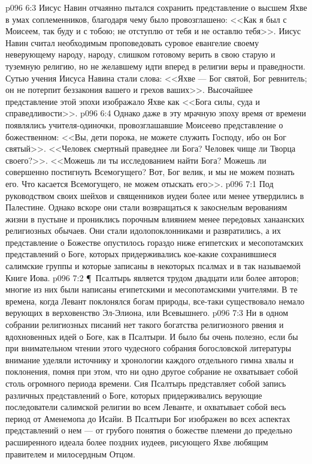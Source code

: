 \vs p096 6:3 Иисус Навин отчаянно пытался сохранить представление о высшем Яхве в умах соплеменников, благодаря чему было провозглашено: <<Как я был с Моисеем, так буду и с тобою; не отступлю от тебя и не оставлю тебя>>. Иисус Навин считал необходимым проповедовать суровое евангелие своему неверующему народу, народу, слишком готовому верить в свою старую и туземную религию, но не желавшему идти вперед в религии веры и праведности. Сутью учения Иисуса Навина стали слова: <<Яхве --- Бог святой, Бог ревнитель; он не потерпит беззакония вашего и грехов ваших>>. Высочайшее представление этой эпохи изображало Яхве как <<Бога силы, суда и справедливости>>.
\vs p096 6:4 Однако даже в эту мрачную эпоху время от времени появлялись учителя\hyp{}одиночки, провозглашавшие Моисеево представление о божественном: <<Вы, дети порока, не можете служить Господу, ибо он Бог святый>>. <<Человек смертный праведнее ли Бога? Человек чище ли Творца своего?>>. <<Можешь ли ты исследованием найти Бога? Можешь ли совершенно постигнуть Всемогущего? Вот, Бог велик, и мы не можем познать его. Что касается Всемогущего, не можем отыскать его>>.
\vs p096 7:1 Под руководством своих шейхов и священников иудеи более или менее утвердились в Палестине. Однако вскоре они стали возвращаться к закоснелым верованиям жизни в пустыне и прониклись порочным влиянием менее передовых ханаанских религиозных обычаев. Они стали идолопоклонниками и развратились, а их представление о Божестве опустилось гораздо ниже египетских и месопотамских представлений о Боге, которых придерживались кое\hyp{}какие сохранившиеся салимские группы и которые записаны в некоторых псалмах и в так называемой Книге Иова.
\vs p096 7:2 \P\ Псалтырь является трудом двадцати или более авторов; многие из них были написаны египетскими и месопотамскими учителями. В те времена, когда Левант поклонялся богам природы, все\hyp{}таки существовало немало верующих в верховенство Эл\hyp{}Элиона, или Всевышнего.
\vs p096 7:3 Ни в одном собрании религиозных писаний нет такого богатства религиозного рвения и вдохновенных идей о Боге, как в Псалтыри. И было бы очень полезно, если бы при внимательном чтении этого чудесного собрания богословской литературы внимание уделяли источнику и хронологии каждого отдельного гимна хвалы и поклонения, помня при этом, что ни одно другое собрание не охватывает собой столь огромного периода времени. Сия Псалтырь представляет собой запись различных представлений о Боге, которых придерживались верующие последователи салимской религии во всем Леванте, и охватывает собой весь период от Аменемопа до Исайи. В Псалтыри Бог изображен во всех аспектах представлений о нем --- от грубого понятия о божестве племени до предельно расширенного идеала более поздних иудеев, рисующего Яхве любящим правителем и милосердным Отцом.
